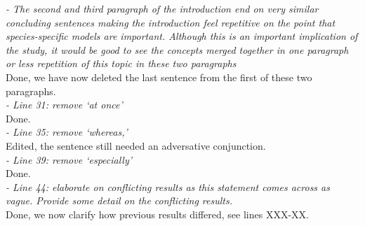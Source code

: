 \documentclass[11pt]{article}
\begin{document}
\emph{- The second and third paragraph of the introduction end on very similar concluding sentences making the introduction feel repetitive on the point that species-specific models are important. Although this is an important implication of the study, it would be good to see the concepts merged together in one paragraph or less repetition of this topic in these two paragraphs}\\
Done, we have now deleted the last sentence from the first of these two paragraphs.\\

\emph{- Line 31: remove ‘at once’}\\
Done.\\

\emph{- Line 35: remove ‘whereas,’}\\
Edited, the sentence still needed an adversative conjunction.\\

\emph{- Line 39: remove ‘especially’}\\
Done.\\

\emph{- Line 44: elaborate on conflicting results as this statement comes across as vague. Provide some detail on the conflicting results.}\\
Done, we now clarify how previous results differed, see lines XXX-XX.
\end{document}
